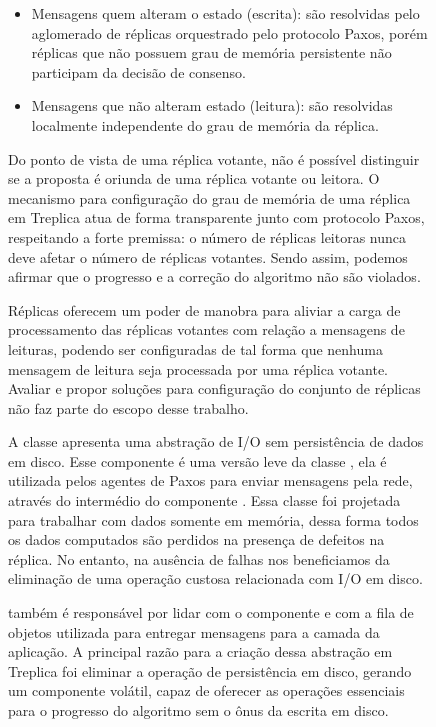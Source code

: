 \begin{figure}[ht]
\begin{itemize}
  \item Mensagens quem alteram o estado (escrita): são resolvidas pelo aglomerado de
    réplicas orquestrado pelo protocolo Paxos, porém réplicas que não possuem grau de
    memória persistente não participam da decisão de consenso.
  \item Mensagens que não alteram estado (leitura): são resolvidas localmente independente
    do grau de memória da réplica.
\end{itemize}

Do ponto de vista de uma réplica votante, não é possível distinguir se a proposta é
oriunda de uma réplica votante ou leitora. O mecanismo para configuração do grau de
memória de uma réplica em Treplica atua de forma transparente junto com protocolo Paxos,
respeitando a forte premissa: o número de réplicas leitoras nunca deve afetar o número de
réplicas votantes. Sendo assim, podemos afirmar que o progresso e a correção do algoritmo
não são violados.

Réplicas oferecem um poder de manobra para aliviar a carga de processamento das réplicas
votantes com relação a mensagens de leituras, podendo ser configuradas de tal forma que
nenhuma mensagem de leitura seja processada por uma réplica votante. Avaliar e propor
soluções para configuração do conjunto de réplicas não faz parte do escopo desse trabalho.


A classe  apresenta uma abstração de I/O sem persistência de
dados em disco. Esse componente é uma versão leve da classe , ela é
utilizada pelos agentes de Paxos para enviar mensagens pela rede, através do intermédio do
componente . Essa classe foi projetada para trabalhar com dados
somente em memória, dessa forma todos os dados computados são perdidos na presença de
defeitos na réplica. No entanto, na ausência de falhas nos beneficiamos da eliminação de
uma operação custosa relacionada com I/O em disco.

 também é responsável por lidar com o componente
 e com a fila de objetos utilizada para entregar mensagens para a camada
da aplicação. A principal razão para a criação dessa abstração em Treplica foi eliminar a
operação de persistência em disco, gerando um componente volátil, capaz de oferecer as
operações essenciais para o progresso do algoritmo sem o ônus da escrita em disco.


\end{figure}
